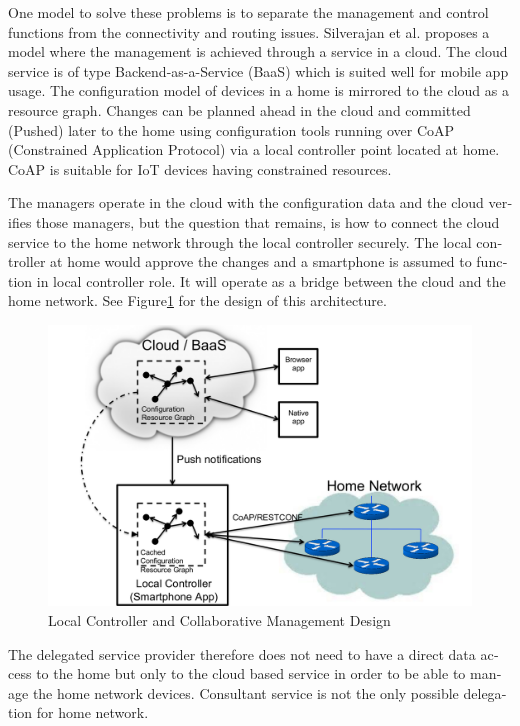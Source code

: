 \documentclass[12pt,a4paper,english]{tutthesis}
\begin{document}
\begin{otherlanguage}{english}
One model to solve these problems is to separate the management and
control functions from the connectivity and routing
issues. Silverajan et al.\cite{silverajan2015collaborative} proposes
a model where the management is achieved through a service in a cloud.
The cloud service is of type Backend-as-a-Service (BaaS) which is suited
well for mobile app usage. The
configuration model of devices in a home is mirrored to the cloud as a
resource graph.
Changes can be planned ahead in the cloud
and committed (Pushed) later to the home  using configuration 
tools 
running over CoAP (Constrained Application Protocol)
via a local controller point located at home.
CoAP is suitable for IoT devices having constrained resources.

The managers operate in the cloud with the configuration data and the
cloud verifies those managers,
but the question that remains, is how to connect the cloud service to the home network
through the local controller securely. The local controller at home
would approve the changes and a smartphone is assumed to function in
local controller role. It will operate as a bridge between the cloud and the home network.
See Figure\ref{fig:localcontroller} for the design of this architecture.

\begin{figure}[htb]
\centering
\includegraphics[width=.9\linewidth]{localcontroller.png}
\caption{\label{fig:localcontroller}Local Controller and Collaborative Management Design}
\end{figure}



The delegated service provider therefore does not need to have a direct data
access to the home but only to the cloud based service in order to be able to
manage the home network devices.
Consultant service is not the only possible delegation for home network.









\end{otherlanguage}
\end{document}
